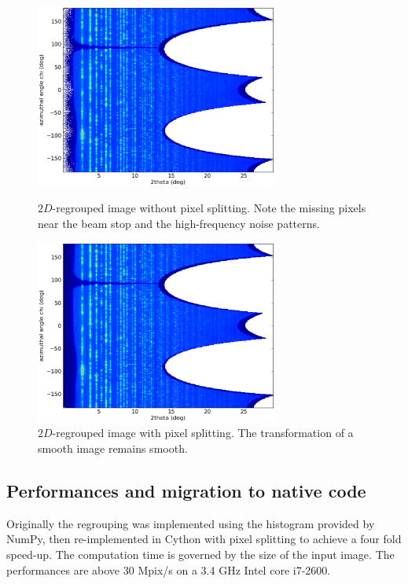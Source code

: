 \documentclass[a4paper]{jpconf}
\begin{document}
\begin{figure}[h]
\begin{minipage}{8cm}
\includegraphics[width=8cm]{img/2Dhistogram.eps}
\caption{\label{rough}$2D$-regrouped image without pixel splitting. Note
the missing pixels near the beam stop and the high-frequency noise patterns.}
\end{minipage}\hspace{5mm}
\begin{minipage}{8cm}
\includegraphics[width=8cm]{img/2DwithSplit.eps}
\caption{\label{smooth}$2D$-regrouped image with pixel splitting. The
transformation of a smooth image remains smooth.}
\end{minipage}
\end{figure}


\subsection{Performances and migration to native code}
Originally the regrouping was implemented using the histogram provided by
NumPy\cite{numpy}, then re-implemented in Cython\cite{cython} with pixel
splitting to achieve a four fold speed-up.
The computation time is governed by the size of the input image. The
performances are above 30 Mpix/s on a 3.4 GHz Intel core i7-2600.
\end{document}
